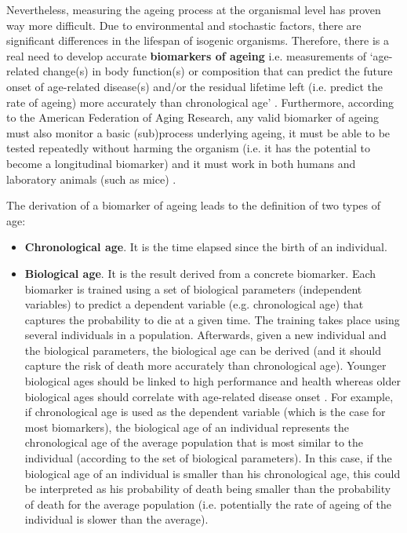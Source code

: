 \bigskip

Nevertheless, measuring the ageing process at the organismal level has proven way more difficult. Due to environmental and stochastic factors, there are significant differences in the lifespan of isogenic organisms. Therefore, there is a real need to develop accurate \textbf{biomarkers of ageing} i.e. measurements of `age-related change(s) in body function(s) or composition that can predict the future onset of age-related disease(s) and/or the residual lifetime left (i.e. predict the rate of ageing) more accurately than chronological age' \cite{Burkle2015a}. Furthermore, according to the American Federation of Aging Research, any valid biomarker of ageing must also monitor a basic (sub)process underlying ageing, it must be able to be tested repeatedly without harming the organism (i.e. it has the potential to become a longitudinal biomarker) and it must work in both humans and laboratory animals (such as mice) \cite{Burkle2015a}.

\bigskip

The derivation of a biomarker of ageing leads to the definition of two types of age:

\begin{itemize}
	
	\item \textbf{Chronological age}. It is the time elapsed since the birth of an individual.
	
	\item \textbf{Biological age}. It is the result derived from a concrete biomarker. Each biomarker is trained using a set of biological parameters (independent variables) to predict a dependent variable (e.g. chronological age) that captures the probability to die at a given time. The training takes place using several individuals in a population. Afterwards, given a new individual and the biological parameters, the biological age can be derived (and it should capture the risk of death more accurately than chronological age). Younger biological ages should be linked to high performance and health whereas older biological ages should correlate with age-related disease onset \cite{Benayoun2015a}. For example, if chronological age is used as the dependent variable (which is the case for most biomarkers), the biological age of an individual represents the chronological age of the average population that is most similar to the individual (according to the set of biological parameters). In this case, if the biological age of an individual is smaller than his chronological age, this could be interpreted as his probability of death being smaller than the probability of death for the average population (i.e. potentially the rate of ageing of the individual is slower than the average). 
	
\end{itemize}

